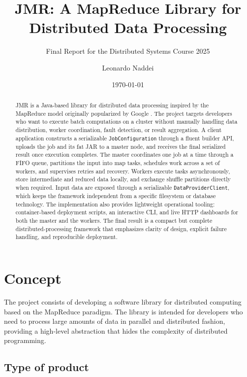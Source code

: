 \documentclass{scrartcl}
\title{\LARGE
    JMR: A MapReduce Library for Distributed Data Processing
}
\subtitle{Final Report for the Distributed Systems Course 2025}
\author{
    Leonardo Naddei \\ \emailaddr{leonardo.naddei@studio.unibo.it}
}
\date{\today}
\begin{document}
\maketitle

\begin{abstract}
    JMR is a Java-based library for distributed data processing inspired by the MapReduce model originally popularized by Google \cite{dean2008mapreduce}. The project targets developers who want to execute batch computations on a cluster without manually handling data distribution, worker coordination, fault detection, or result aggregation. A client application constructs a serializable \texttt{JobConfiguration} through a fluent builder API, uploads the job and its fat JAR to a master node, and receives the final serialized result once execution completes. The master coordinates one job at a time through a FIFO queue, partitions the input into map tasks, schedules work across a set of workers, and supervises retries and recovery. Workers execute tasks asynchronously, store intermediate and reduced data locally, and exchange shuffle partitions directly when required. Input data are exposed through a serializable \texttt{DataProviderClient}, which keeps the framework independent from a specific filesystem or database technology. The implementation also provides lightweight operational tooling: container-based deployment scripts, an interactive CLI, and live HTTP dashboards for both the master and the workers. The final result is a compact but complete distributed-processing framework that emphasizes clarity of design, explicit failure handling, and reproducible deployment.
\end{abstract}



\section{Concept}\label{concept}

The project consists of developing a software library for distributed computing based on the MapReduce paradigm. The library is intended for developers who need to process large amounts of data in parallel and distributed fashion, providing a high-level abstraction that hides the complexity of distributed programming.

\subsection{Type of product}
\end{document}
